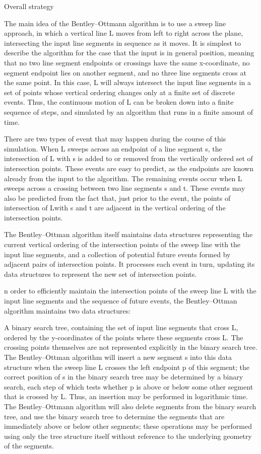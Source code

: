 \documentclass[10pt,letterpaper,twocolumn,twosided]{article}
\begin{document}
Overall strategy

The main idea of the Bentley–Ottmann algorithm is to use a sweep line approach, in which a vertical line L moves from left to right across the plane, intersecting the input line segments in sequence as it moves. It is simplest to describe the algorithm for the case that the input is in general position, meaning that no two line segment endpoints or crossings have the same x-coordinate, no segment endpoint lies on another segment, and no three line segments cross at the same point. In this case, L will always intersect the input line segments in a set of points whose vertical ordering changes only at a finite set of discrete events. Thus, the continuous motion of L can be broken down into a finite sequence of steps, and simulated by an algorithm that runs in a finite amount of time.

There are two types of event that may happen during the course of this simulation. When L sweeps across an endpoint of a line segment s, the intersection of L with s is added to or removed from the vertically ordered set of intersection points. These events are easy to predict, as the endpoints are known already from the input to the algorithm. The remaining events occur when L sweeps across a crossing between two line segments s and t. These events may also be predicted from the fact that, just prior to the event, the points of intersection of Lwith s and t are adjacent in the vertical ordering of the intersection points.

The Bentley–Ottman algorithm itself maintains data structures representing the current vertical ordering of the intersection points of the sweep line with the input line segments, and a collection of potential future events formed by adjacent pairs of intersection points. It processes each event in turn, updating its data structures to represent the new set of intersection points.

n order to efficiently maintain the intersection points of the sweep line L with the input line segments and the sequence of future events, the Bentley–Ottman algorithm maintains two data structures:

A binary search tree, containing the set of input line segments that cross L, ordered by the y-coordinates of the points where these segments cross L. The crossing points themselves are not represented explicitly in the binary search tree. The Bentley–Ottman algorithm will insert a new segment s into this data structure when the sweep line L crosses the left endpoint p of this segment; the correct position of s in the binary search tree may be determined by a binary search, each step of which tests whether p is above or below some other segment that is crossed by L. Thus, an insertion may be performed in logarithmic time. The Bentley–Ottmann algorithm will also delete segments from the binary search tree, and use the binary search tree to determine the segments that are immediately above or below other segments; these operations may be performed using only the tree structure itself without reference to the underlying geometry of the segments.
\end{document}
